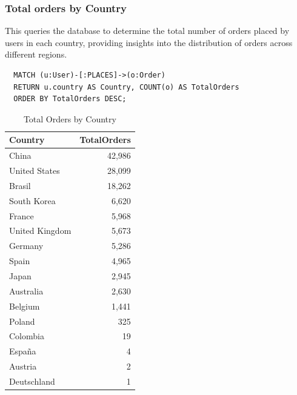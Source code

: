 \documentclass[a4paper,12pt]{article}
\begin{document}
\subsubsection{Total orders by Country}
This queries the database to determine the total number of orders placed by users in each country, providing insights into the distribution of orders across different regions.
\begin{verbatim}
  MATCH (u:User)-[:PLACES]->(o:Order)
  RETURN u.country AS Country, COUNT(o) AS TotalOrders
  ORDER BY TotalOrders DESC;
\end{verbatim}
\begin{table}[h!]
  \centering
  \caption{Total Orders by Country}
  \label{tab:total_orders}
  \begin{tabular}{l r}
      \toprule
      \textbf{Country} & \textbf{TotalOrders} \\
      \midrule
      China           & 42,986 \\
      United States   & 28,099 \\
      Brasil          & 18,262 \\
      South Korea     & 6,620  \\
      France          & 5,968  \\
      United Kingdom  & 5,673  \\
      Germany         & 5,286  \\
      Spain           & 4,965  \\
      Japan           & 2,945  \\
      Australia       & 2,630  \\
      Belgium         & 1,441  \\
      Poland          & 325    \\
      Colombia        & 19     \\
      España          & 4      \\
      Austria         & 2      \\
      Deutschland     & 1      \\
      \bottomrule
  \end{tabular}
\end{table}
\end{document}

